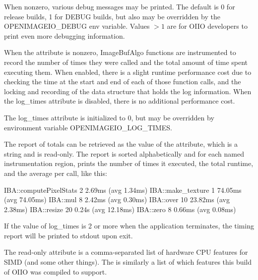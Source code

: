 \vspace{10pt}
When nonzero, various debug messages may be printed. The default is 0 for
release builds, 1 for {\cf DEBUG} builds, but also may be overridden by the
{\cf OPENIMAGEIO\_DEBUG} env variable. Values $> 1$ are for OIIO developers
to print even more debugging information.
\apiend

\vspace{10pt}
 
\NEW %

When the  attribute is nonzero, {\cf ImageBufAlgo} functions
are instrumented to record the number of times they were called and the
total amount of time spent executing them. When enabled, there is a slight
runtime performance cost due to checking the time at the start and end of
each of those function calls, and the locking and recording of the data
structure that holds the log information. When the {\cf log_times} attribute
is disabled, there is no additional performance cost.

The {\cf log_times} attribute is initialized to 0, but may be overridden by
environment variable {\cf OPENIMAGEIO_LOG_TIMES}.

The report of totals can be retrieved as the value of the
 attribute, which is a string and is read-only. The
report is sorted alphabetically and for each named instrumentation region,
prints the number of times it executed, the total runtime, and the average
per call, like this:
\begin{code}
    IBA::computePixelStats        2   2.69ms  (avg   1.34ms)
    IBA::make_texture             1  74.05ms  (avg  74.05ms)
    IBA::mul                      8   2.42ms  (avg   0.30ms)
    IBA::over                    10  23.82ms  (avg   2.38ms)
    IBA::resize                  20   0.24s   (avg  12.18ms)
    IBA::zero                     8   0.66ms  (avg   0.08ms)
\end{code}

If the value of {\cf log_times} is 2 or more when the application terminates,
the timing report will be printed to {\cf stdout} upon exit.
\apiend

\vspace{10pt}
 
The  read-only attribute is a comma-separated list of
hardware CPU features for SIMD (and some other things). The 
is similarly a list of which features this build of OIIO was compiled
to support.
\apiend

